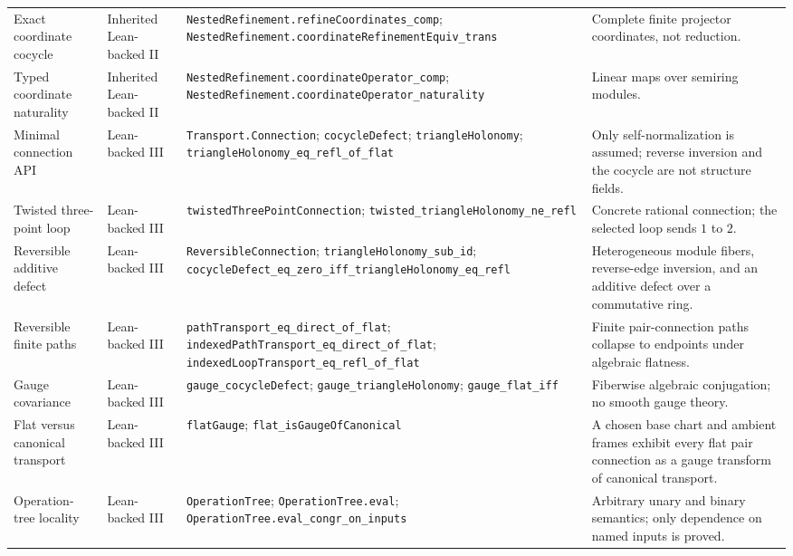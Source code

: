 \documentclass[11pt,a4paper]{article}
\theoremstyle{plain}
\theoremstyle{definition}
\theoremstyle{remark}
\newcommand{\leanname}[1]{\nolinkurl{#1}}
\begin{document}
\begin{longtable}{L{0.17\textwidth}L{0.18\textwidth}L{0.25\textwidth}L{0.22\textwidth}}
\addlinespace
Exact coordinate cocycle
& Inherited Lean-backed II
& \leanname{NestedRefinement.refineCoordinates_comp}; \leanname{NestedRefinement.coordinateRefinementEquiv_trans}
& Complete finite projector coordinates, not reduction.\\
\addlinespace
Typed coordinate naturality
& Inherited Lean-backed II
& \leanname{NestedRefinement.coordinateOperator_comp}; \leanname{NestedRefinement.coordinateOperator_naturality}
& Linear maps over semiring modules.\\
\addlinespace
Minimal connection API
& Lean-backed III
& \leanname{Transport.Connection}; \leanname{cocycleDefect}; \leanname{triangleHolonomy}; \leanname{triangleHolonomy_eq_refl_of_flat}
& Only self-normalization is assumed; reverse inversion and the cocycle are not structure fields.\\
\addlinespace
Twisted three-point loop
& Lean-backed III
& \leanname{twistedThreePointConnection}; \leanname{twisted_triangleHolonomy_ne_refl}
& Concrete rational connection; the selected loop sends \(1\) to \(2\).\\
\addlinespace
Reversible additive defect
& Lean-backed III
& \leanname{ReversibleConnection}; \leanname{triangleHolonomy_sub_id}; \leanname{cocycleDefect_eq_zero_iff_triangleHolonomy_eq_refl}
& Heterogeneous module fibers, reverse-edge inversion, and an additive defect over a commutative ring.\\
\addlinespace
Reversible finite paths
& Lean-backed III
& \leanname{pathTransport_eq_direct_of_flat}; \leanname{indexedPathTransport_eq_direct_of_flat}; \leanname{indexedLoopTransport_eq_refl_of_flat}
& Finite pair-connection paths collapse to endpoints under algebraic flatness.\\
\addlinespace
Gauge covariance
& Lean-backed III
& \leanname{gauge_cocycleDefect}; \leanname{gauge_triangleHolonomy}; \leanname{gauge_flat_iff}
& Fiberwise algebraic conjugation; no smooth gauge theory.\\
\addlinespace
Flat versus canonical transport
& Lean-backed III
& \leanname{flatGauge}; \leanname{flat_isGaugeOfCanonical}
& A chosen base chart and ambient frames exhibit every flat pair connection as a gauge transform of canonical transport.\\
\addlinespace
Operation-tree locality
& Lean-backed III
& \leanname{OperationTree}; \leanname{OperationTree.eval}; \leanname{OperationTree.eval_congr_on_inputs}
& Arbitrary unary and binary semantics; only dependence on named inputs is proved.\\

\end{longtable}
\end{document}
